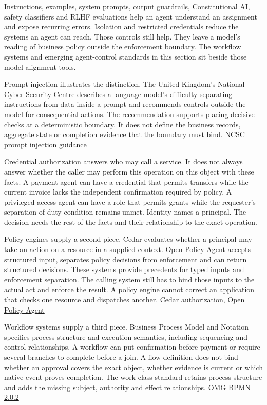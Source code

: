 \documentclass[
  american,
  11pt,
  letterpaper,
]{article}
\begin{document}
Instructions, examples, system prompts, output guardrails,
Constitutional AI, safety classifiers and RLHF evaluations help an agent
understand an assignment and expose recurring errors. Isolation and
restricted credentials reduce the systems an agent can reach. Those
controls still help. They leave a model's reading of business policy
outside the enforcement boundary. The workflow systems and emerging
agent-control standards in this section sit beside those model-alignment
tools.

Prompt injection illustrates the distinction. The United Kingdom's
National Cyber Security Centre describes a language model's difficulty
separating instructions from data inside a prompt and recommends
controls outside the model for consequential actions. The recommendation
supports placing decisive checks at a deterministic boundary. It does
not define the business records, aggregate state or completion evidence
that the boundary must bind.
\href{https://www.ncsc.gov.uk/blog-post/prompt-injection-is-not-sql-injection}{NCSC
prompt injection guidance}

Credential authorization answers who may call a service. It does not
always answer whether the caller may perform this operation on this
object with these facts. A payment agent can have a credential that
permits transfers while the current invoice lacks the independent
confirmation required by policy. A privileged-access agent can have a
role that permits grants while the requester's separation-of-duty
condition remains unmet. Identity names a principal. The decision needs
the rest of the facts and their relationship to the exact operation.

Policy engines supply a second piece. Cedar evaluates whether a
principal may take an action on a resource in a supplied context. Open
Policy Agent accepts structured input, separates policy decisions from
enforcement and can return structured decisions. These systems provide
precedents for typed inputs and enforcement separation. The calling
system still has to bind those inputs to the actual act and enforce the
result. A policy engine cannot correct an application that checks one
resource and dispatches another.
\href{https://docs.cedarpolicy.com/auth/authorization.html}{Cedar
authorization}, \href{https://www.openpolicyagent.org/docs}{Open Policy
Agent}

Workflow systems supply a third piece. Business Process Model and
Notation specifies process structure and execution semantics, including
sequencing and control relationships. A workflow can put confirmation
before payment or require several branches to complete before a join. A
flow definition does not bind whether an approval covers the exact
object, whether evidence is current or which native event proves
completion. The work-class standard retains process structure and adds
the missing subject, authority and effect relationships.
\href{https://www.omg.org/spec/BPMN/2.0.2/}{OMG BPMN 2.0.2}
\end{document}

